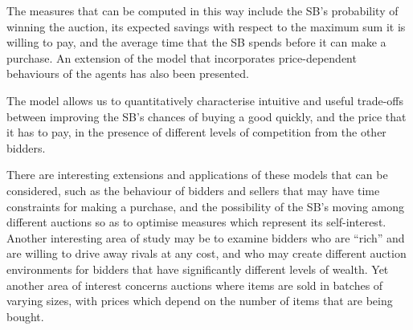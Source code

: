 \documentclass{comjnl}
\begin{document}
The measures that can be computed in this way include the SB's
probability of winning the auction, its expected savings with
respect to the maximum sum it is willing to pay, and the average
time that the SB spends before it can make a purchase. An
extension of the model that incorporates price-dependent
behaviours of the agents has also been presented.

The model allows us to quantitatively characterise intuitive and
useful trade-offs between improving the SB's chances of buying a
good quickly, and the price that it has to pay, in the presence of
different levels of competition from the other bidders.


There are interesting extensions and applications of these models
that can be considered, such as the behaviour of bidders and
sellers that may have time constraints for making a purchase, and
the possibility of the SB's moving among different auctions so as
to optimise measures which represent its self-interest. Another
interesting area of study may be to examine bidders who are
``rich'' and are willing to drive away rivals at any cost, and who
may create different auction environments for bidders that have
significantly different levels of wealth. Yet another area of
interest concerns auctions where items are sold in batches of
varying sizes, with prices which depend on the number of items
that are being bought.



\nocite{*}



\end{document}
